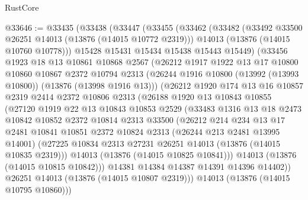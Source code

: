 \begin{lexlean}{RustCore}
\begin{coremodule}
@33646 := @33435
    (@33438
      (@33447
        (@33455
          (@33462
            (@33482
              (@33492 @33500 @26251 @14013 (@13876 (@14015 @10772 @2319)))
              @14013
              (@13876 (@14015 @10760 @10778)))
            @15428
            @15431
            @15434
            @15438
            @15443
            @15449)
          (@33456
            @1923
            @18
            @13
            @10861
            @10868
            @2567
            (@26212
              @1917
              @1922
              @13
              @17
              @10800
              @10860
              @10867
              @2372
              @10794
              @2313
              (@26244 @1916 @10800 (@13992 (@13993 @10800)) (@13876 (@13998 @1916 @13)))
              (@26212
                @1920
                @174
                @13
                @16
                @10857
                @2319
                @2414
                @2372
                @10806
                @2313
                (@26188
                  @1920
                  @13
                  @10843
                  @10855
                  (@27120
                    @1919
                    @22
                    @13
                    @10843
                    @10853
                    @2529
                    (@33483
                      @1316
                      @13
                      @18
                      @2473
                      @10842
                      @10852
                      @2372
                      @10814
                      @2313
                      @33500
                      (@26212
                        @214
                        @234
                        @13
                        @17
                        @2481
                        @10841
                        @10851
                        @2372
                        @10824
                        @2313
                        (@26244 @213 @2481 @13995 @14001)
                        (@27225 @10834 @2313 @27231 @26251 @14013 (@13876 (@14015 @10835 @2319)))
                        @14013
                        (@13876 (@14015 @10825 @10841)))
                      @14013
                      (@13876 (@14015 @10815 @10842)))
                    @14381
                    @14384
                    @14387
                    @14391
                    @14396
                    @14402))
                @26251
                @14013
                (@13876 (@14015 @10807 @2319)))
              @14013
              (@13876 (@14015 @10795 @10860)))

\end{coremodule}
\end{lexlean}
